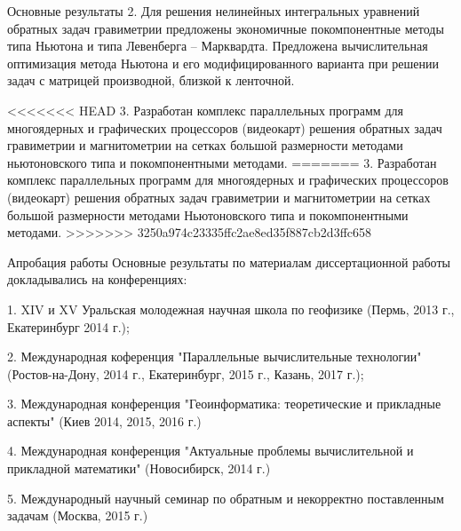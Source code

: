 \documentclass[10pt,pdf, mathserif, hyperref={unicode}]{beamer}
\begin{document}
\begin{frame}{Основные результаты}
	2. Для решения нелинейных интегральных уравнений обратных задач гравиметрии предложены экономичные покомпонентные методы 
	типа Ньютона и типа Левенберга – Марквардта. Предложена вычислительная оптимизация метода 
	Ньютона и его модифицированного варианта при решении задач 
	с матрицей производной, близкой к ленточной. 
	
<<<<<<< HEAD
	\vskip 0.5cm
	3. Разработан комплекс параллельных программ для многоядерных и графических процессоров (видеокарт) решения обратных задач гравиметрии и магнитометрии на сетках большой размерности методами ньютоновского типа и покомпонентными методами. 
=======
	3. Разработан комплекс параллельных программ для многоядерных и графических процессоров (видеокарт) решения обратных задач гравиметрии и магнитометрии на сетках большой размерности методами Ньютоновского типа и покомпонентными методами. 
>>>>>>> 3250a974c23335ffc2ae8ed35f887cb2d3ffc658
\end{frame}
	
\begin{frame}{Апробация работы}
	Основные результаты по материалам диссертационной работы докладывались на конференциях:
	
	
	1. XIV и XV Уральская молодежная научная школа по геофизике (Пермь, 2013 г., Екатеринбург 2014 г.);
	
	2. Международная коференция "Параллельные вычислительные технологии" (Ростов-на-Дону, 2014 г., Екатеринбург, 2015 г., Казань, 2017 г.);
	
	3. Международная конференция "Геоинформатика: теоретические и прикладные аспекты" (Киев 2014, 2015, 2016 г.)
	
	4. Международная конференция "Актуальные проблемы вычислительной и прикладной математики" (Новосибирск, 2014 г.)
	
	5. Международный научный семинар по обратным и некорректно поставленным задачам (Москва, 2015 г.)
\end{frame}
\end{document}
